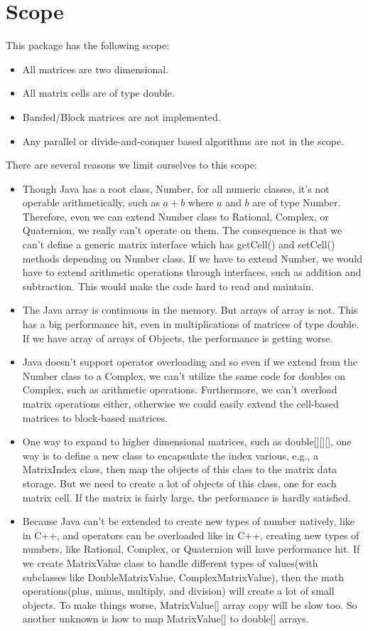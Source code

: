 \section{Scope}
This package has the following scope:
\begin{itemize}
\item All matrices are two dimensional.
\item All matrix cells are of type double.
\item Banded/Block matrices are not implemented.
\item Any parallel or divide-and-conquer based algorithms are not in the scope.
\end{itemize}
There are several reasons we limit ourselves to this scope:
\begin{itemize}
\item Though Java has a root class, Number, for all numeric classes, it's not operable arithmetically, such as $a + b$ where $a$ and $b$ are of type Number. Therefore, even we can extend Number class to Rational, Complex, or Quaternion, we really can't operate on them. The consequence is that we can't define a generic matrix interface which has getCell() and setCell() methods depending on Number class. If we have to extend Number, we would have to extend arithmetic operations through interfaces, such as addition and subtraction. This would make the code hard to read and maintain. 
\item The Java array is continuous in the memory. But arrays of array is not. This has a big performance hit, even in multiplications of matrices of type double. If we have array of arrays of Objects, the performance is getting worse.
\item Java doesn't support operator overloading and so even if we extend from the Number class to a Complex, we can't utilize the same code for doubles on Complex, such as arithmetic operations. Furthermore, we can't overload matrix operations either, otherwise we could easily extend the cell-based matrices to block-based matrices.
\item One way to expand to higher dimensional matrices, such as double[][][], one way is to define a new class to encapsulate the index various, e.g., a MatrixIndex class, then map the objects of this class to the matrix data storage. But we need to create a lot of objects of this class, one for each matrix cell. If the matrix is fairly large, the performance is hardly satisfied.
\item Because Java can't be extended to create new types of number natively, like in C++, and operators can be overloaded like in C++, creating new types of numbers, like Rational, Complex, or Quaternion will have performance hit. If we create MatrixValue class to handle different types of values(with subclasses like DoubleMatrixValue, ComplexMatrixValue), then the math operations(plus, minus, multiply, and division) will create a lot of small objects. To make things worse, MatrixValue[] array copy will be slow too. So another unknown is how to map MatrixValue[] to double[] arrays.
\end{itemize}
